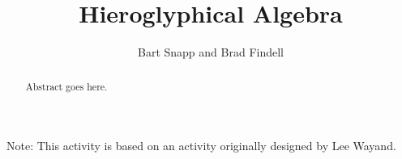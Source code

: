 \documentclass{ximera}
\title{Hieroglyphical Algebra}
\author{Bart Snapp and Brad Findell}
\begin{document}
\begin{abstract}
Abstract goes here.  
\end{abstract}
\maketitle

\label{A:HAlgebra} 
Note: This activity is based on an activity originally designed by Lee Wayand.

\newcommand{\lo}{\vcenter{\hbox{\textproto{a}}}}
\newcommand{\loo}{\vcenter{\hbox{\textproto{d}}}}
\newcommand{\la}{\vcenter{\hbox{\textproto{w}}}}
\newcommand{\lb}{\vcenter{\hbox{\textproto{H}}}}
\newcommand{\lc}{\vcenter{\hbox{\textproto{T}}}}
\newcommand{\ld}{\vcenter{\hbox{\textproto{K}}}}
\newcommand{\lf}{\vcenter{\hbox{\textproto{E}}}}
\newcommand{\lh}{\vcenter{\hbox{\textproto{l}}}}
\newcommand{\li}{\vcenter{\hbox{\textproto{o}}}}
\newcommand{\lx}{\vcenter{\hbox{\textproto{x}}}}
\newcommand{\ly}{\vcenter{\hbox{\textproto{R}}}}
\newcommand{\lz}{\vcenter{\hbox{\textproto{v}}}}
\newcommand{\lw}{\vcenter{\hbox{\textproto{q}}}}

\end{document}
